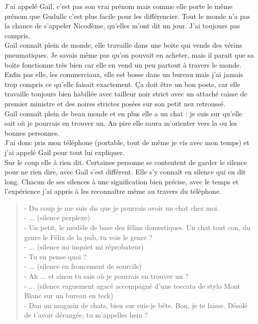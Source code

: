 J'ai appelé Gaïl, c'est pas son vrai prénom mais comme elle porte le même prénom que Gudulle c'est plus facile pour les différencier. Tout le monde n'a pas la chance de s’appeler Nicodème, qu'elles m'ont dit un jour. J'ai toujours pas compris. \\
Gaïl connaît plein de monde, elle travaille dans une boite qui vends des vérins pneumatiques. Je savais même pas qu'on pouvait en acheter, mais il parait que sa boite fonctionne très bien car elle en vend un peu partout à travers le monde. Enfin pas elle, les commerciaux, elle est bosse dans un bureau mais j'ai jamais trop compris ce qu'elle faisait exactement. Ça doit être un bon poste, car elle travaille toujours bien habillée avec tailleur noir strict avec un attaché caisse de premier ministre et des noires strictes posées sur son petit nez retroussé. \\
Gaïl connaît plein de beau monde et en plus elle a un chat : je suis sur qu'elle sait où je pourrais en trouver un. Au pire elle saura m'orienter vers la ou les bonnes personnes. \\

J'ai donc pris mon téléphone (portable, tout de même je vis avec mon temps) et j'ai appelé Gaïl pour tout lui expliquer. \\
Sur le coup elle à rien dit. Certaines personne se contentent de garder le silence pour ne rien dire, avec Gaïl s'est différent. Elle s'y connaît en silence qui en dit long. Chacun de ses silences à une signification bien précise, avec le temps et l'expérience j'ai appris à les reconnaître même au travers du téléphone. \\

\begin{quote}
- Du coup je me suis dis que je pourrais avoir un chat chez moi. \\
- ... (silence perplexe)\\
- Un petit, le modèle de base des félins domestiques. Un chat tout con, du genre le Félix de la pub, tu vois le genre ? \\
- ... (silence mi inquiet mi réprobateur)\\
- Tu en pense quoi ?\\
- ... (silence en froncement de sourcils)\\
- Ah ... et sinon tu sais où je pourrais en trouver un ?\\
- ... (silence vaguement agacé accompagné d'une toccata de stylo Mont Blanc sur un bureau en teck)\\
- Dan un magasin de chats, bien sur suis-je bête. Bon, je te laisse. Désolé de t'avoir dérangée, tu m'appelles hein ? \\
\end{quote}

